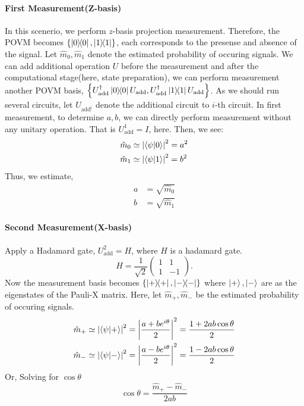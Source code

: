 \documentclass[a4paper, 11pt]{article}
\begin{document}
\paragraph{First Measurement(Z-basis) } 
In this scenerio, we perform $z$-basis projection measurement. 
Therefore, the POVM becomes $\left\{ \ketbra{0}, \ketbra{1}\right\}$, each corresponds to the presense and absence of the signal. 
Let $\hat{m}_0, \hat{m}_1$ denote the estimated probability of occuring signals. 
We can add additional operation $U$ before the measurement and after the computational stage(here, state preparation), we can perform measurement another POVM basis, $\left\{ U_{\text{add}}^{\dagger} \ketbra{0} U_{\text{add}}, U_{\text{add}}^{\dagger} \ketbra{1} U_{\text{add}}\right\}$.
As we should run several circuits, let $U_{\text{add}^{i}}$ denote the additional circuit to $i$-th circuit.
In first measurement, to determine $a, b$, we can directly perform measurement without any unitary operation. That is $U_{\text{add}}^{1} = I$, here. 
Then, we see:
\begin{align}
  \hat{m}_0 &\simeq  \left| \bra{\psi}\ket{0} \right|^2 = a^2 \\
  \hat{m}_1 &\simeq  \left| \bra{\psi}\ket{1} \right|^2 = b^2 
\end{align}
Thus, we estimate,
\begin{align}
  a &= \sqrt{\hat{m}_0} \\
  b &= \sqrt{\hat{m}_1} 
\end{align}
\paragraph{Second Measurement(X-basis)}
Apply a Hadamard gate, $U_{\text{add}}^{2} = H$, where $H$ is a hadamard gate.
\begin{equation}
  H = \frac{1}{\sqrt{2}}
  \begin{pmatrix}
    1 & 1 \\
    1 & -1
  \end{pmatrix}.
\end{equation}
Now the measurement basis becomes $\left\{ \ketbra{+}, \ketbra{-}\right\}$ where $\ket{+}, \ket{-}$ are as the eigenstates of the Pauli-X matrix. 
Here, let $\hat{m}_{+}, \hat{m}_{-}$ be the estimated probability of occuring signals.
\begin{align}
  \hat{m}_{+} &\simeq  \left| \bra{\psi}\ket{+} \right|^2 = \left| \frac{a + b e^{i\theta}}{2} \right|^2 = \frac{1 + 2ab\cos\theta}{2}  \\
  \hat{m}_{-} &\simeq  \left| \bra{\psi}\ket{-} \right|^2 = \left| \frac{a - b e^{i\theta}}{2} \right|^2 = \frac{1 - 2ab\cos\theta}{2} 
\end{align}
Or, Solving for $\cos\theta$
\begin{equation}
  \cos\theta = \frac{\hat{m}_{+} - \hat{m}_{-}}{2ab}
\end{equation}
\end{document}
